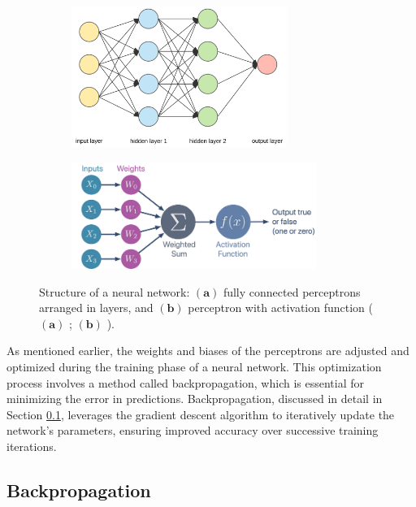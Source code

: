 \begin{figure}[H]
    \centering
    \begin{subfigure}{0.45\textwidth}
        \includegraphics[width=7cm]{Cap2_LitReview/model_basics/Neural_networks/neural_network.png}
        \caption{}
        \label{fig:neural_network-a}
    \end{subfigure}
    \hspace{0.2cm}
    \begin{subfigure}{0.45\textwidth}
        \includegraphics[width=8cm]{Cap2_LitReview/model_basics/Neural_networks/perceptron.png}
        \caption{}
        \label{fig:neural_network-b}
    \end{subfigure}
    \caption{Structure of a neural network: $\boldsymbol{(a)}$ fully connected perceptrons arranged in layers, and $\boldsymbol{(b)}$ perceptron with activation function ($\boldsymbol{(a)}$ \cite{P._2025}; $\boldsymbol{(b)}$ \cite{Weaver_2024}).}
    \label{fig:neural_network}
\end{figure}

As mentioned earlier, the weights and biases of the perceptrons are adjusted and optimized during the training phase of a neural network. This optimization process involves a method called backpropagation, which is essential for minimizing the error in predictions. Backpropagation, discussed in detail in Section \ref{sec-backpropagation}, leverages the gradient descent algorithm to iteratively update the network's parameters, ensuring improved accuracy over successive training iterations.

\subsection{Backpropagation} \label{sec-backpropagation}

